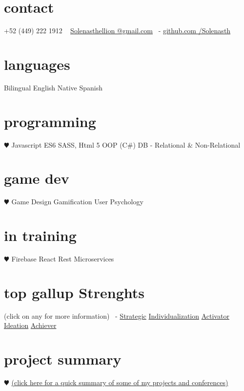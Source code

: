 \documentclass[]{cv-style}          %
\begin{document}

\lastupdated


\begin{aside}
%
\section{contact}
+52 (449) 222 1912
~
\href{mailto:Solenasthellion
@gmail.com}{Solenasthellion
@gmail.com}
~-
\href{https://github.com/Solenasth/}{github.com
/Solenasth}
%
\section{languages}
Bilingual English
Native Spanish
%
\section{programming}
{\color{red} $\varheartsuit$} Javascript ES6
SASS, Html 5
OOP (C\#)
DB - Relational \& Non-Relational
\section{game dev}
{\color{red} $\varheartsuit$} Game Design
Gamification
User Psychology
\section{in training}
{\color{red} $\varheartsuit$} Firebase
React
Rest Microservices
\section{top gallup Strenghts}
(click on any for more information)
~-
\href{https://news.gallup.com/businessjournal/718/strategic.aspx}{Strategic}
\href{https://news.gallup.com/businessjournal/685/individualization.aspx}{Individualization}
\href{https://news.gallup.com/businessjournal/625/activator.aspx}{Activator}
\href{https://news.gallup.com/businessjournal/679/ideation.aspx}{Ideation}
\href{https://news.gallup.com/businessjournal/622/achiever.aspx}{Achiever}
%
\section{project summary}
{\color{red} $\varheartsuit$} \href{https://docs.google.com/document/d/1Aj6Jy7RefQvkJJ9pEEydWflzKYrMHOWXZvgLfn9VK6s/edit?usp=sharing}{(click here for a quick summary of some of my projects and conferences)}
\end{aside}
\end{document}
